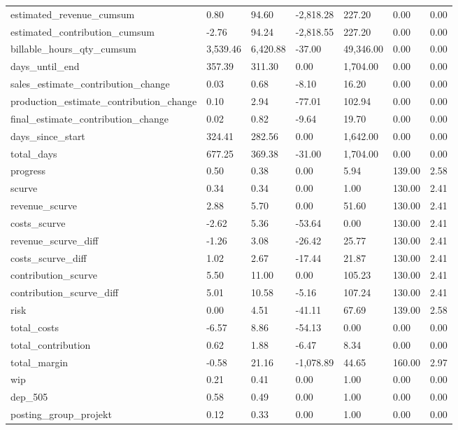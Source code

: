 \begin{longtable}[h!]{lllllll}
estimated_revenue_cumsum & 0.80 & 94.60 & -2,818.28 & 227.20 & 0.00 & 0.00 \\
estimated_contribution_cumsum & -2.76 & 94.24 & -2,818.55 & 227.20 & 0.00 & 0.00 \\
billable_hours_qty_cumsum & 3,539.46 & 6,420.88 & -37.00 & 49,346.00 & 0.00 & 0.00 \\
days_until_end & 357.39 & 311.30 & 0.00 & 1,704.00 & 0.00 & 0.00 \\
sales_estimate_contribution_change & 0.03 & 0.68 & -8.10 & 16.20 & 0.00 & 0.00 \\
production_estimate_contribution_change & 0.10 & 2.94 & -77.01 & 102.94 & 0.00 & 0.00 \\
final_estimate_contribution_change & 0.02 & 0.82 & -9.64 & 19.70 & 0.00 & 0.00 \\
days_since_start & 324.41 & 282.56 & 0.00 & 1,642.00 & 0.00 & 0.00 \\
total_days & 677.25 & 369.38 & -31.00 & 1,704.00 & 0.00 & 0.00 \\
progress & 0.50 & 0.38 & 0.00 & 5.94 & 139.00 & 2.58 \\
scurve & 0.34 & 0.34 & 0.00 & 1.00 & 130.00 & 2.41 \\
revenue_scurve & 2.88 & 5.70 & 0.00 & 51.60 & 130.00 & 2.41 \\
costs_scurve & -2.62 & 5.36 & -53.64 & 0.00 & 130.00 & 2.41 \\
revenue_scurve_diff & -1.26 & 3.08 & -26.42 & 25.77 & 130.00 & 2.41 \\
costs_scurve_diff & 1.02 & 2.67 & -17.44 & 21.87 & 130.00 & 2.41 \\
contribution_scurve & 5.50 & 11.00 & 0.00 & 105.23 & 130.00 & 2.41 \\
contribution_scurve_diff & 5.01 & 10.58 & -5.16 & 107.24 & 130.00 & 2.41 \\
risk & 0.00 & 4.51 & -41.11 & 67.69 & 139.00 & 2.58 \\
total_costs & -6.57 & 8.86 & -54.13 & 0.00 & 0.00 & 0.00 \\
total_contribution & 0.62 & 1.88 & -6.47 & 8.34 & 0.00 & 0.00 \\
total_margin & -0.58 & 21.16 & -1,078.89 & 44.65 & 160.00 & 2.97 \\
wip & 0.21 & 0.41 & 0.00 & 1.00 & 0.00 & 0.00 \\
dep_505 & 0.58 & 0.49 & 0.00 & 1.00 & 0.00 & 0.00 \\
posting_group_projekt & 0.12 & 0.33 & 0.00 & 1.00 & 0.00 & 0.00 \\

\end{longtable}
